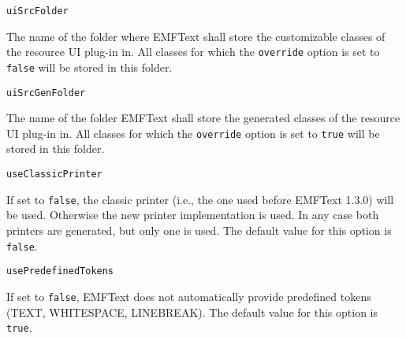 \noindent\texttt{uiSrcFolder}
\begin{myindentpar}{1cm}
The name of the folder where EMFText shall store the customizable classes of the resource UI plug-in in. All classes for which the \texttt{override} option is set to \texttt{false} will be stored in this folder.
\end{myindentpar}

\noindent\texttt{uiSrcGenFolder}
\begin{myindentpar}{1cm}
The name of the folder EMFText shall store the generated classes of the resource UI plug-in in. All classes for which the \texttt{override} option is set to \texttt{true} will be stored in this folder.
\end{myindentpar}

\noindent\texttt{useClassicPrinter}
\begin{myindentpar}{1cm}
If set to \texttt{false}, the classic printer (i.e., the one used before EMFText 1.3.0) will be used. Otherwise the new printer implementation is used. In any case both printers are generated, but only one is used. The default value for this option is \texttt{false}.
\end{myindentpar}

\noindent\texttt{usePredefinedTokens}
\begin{myindentpar}{1cm}
If set to \texttt{false}, EMFText does not automatically provide predefined tokens (TEXT, WHITESPACE, LINEBREAK). The default value for this option is \texttt{true}.
\end{myindentpar}

